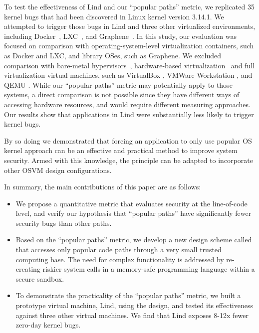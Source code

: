 To test the effectiveness of Lind and our ``popular paths'' metric, 
we replicated 35 kernel bugs that had been
discovered in Linux kernel version 3.14.1.  We attempted to trigger those
bugs in Lind and three other virtualized environments,
including Docker~\cite{Docker}, LXC~\cite{LXC}, and Graphene~\cite{Graphene-14}. 
In this study, our evaluation was focused on comparison with operating-system-level virtualization containers, such as Docker and LXC, 
and library OSes, such as Graphene. 
We excluded comparison with bare-metal hypervisors~\cite{Xen-03, VMWare-Server}, 
hardware-based virtualization~\cite{IntelVT, keller2010nohype} and full virtualization 
virtual machines, such as VirtualBox \cite{VirtualBox}, VMWare Workstation \cite{VMWare-Workstation}, and QEMU \cite{QEMU}. 
While our ``popular paths'' metric may potentially apply to those
systems, a direct comparison is not possible since they have different 
ways of accessing hardware resources, and would require different measuring approaches.
Our results show that applications in Lind were substantially less likely to trigger kernel bugs.

By so doing we demonstrated that forcing an application to only use popular
OS kernel approach can be an effective and practical method to improve
system security. Armed with this knowledge, the \lip principle can be adapted to incorporate other OSVM design configurations. 

In summary, the main contributions of this paper are as follows:

\begin{itemize}\setlength\itemsep{0em}
\item
We propose a quantitative metric that evaluates security at the line-of-code level, 
and verify our hypothesis that ``popular paths'' have significantly fewer security bugs than other paths. 
\item
Based on the ``popular paths'' metric, we develop a new design scheme called \lip that accesses only popular code paths through a very small trusted computing base. 
The need for complex functionality is addressed by re-creating riskier system calls in a memory-safe programming language within a secure sandbox.
\item
To demonstrate the practicality of the ``popular paths'' metric, we built a prototype virtual machine, Lind, using the \lip design, 
and tested its effectiveness against three other virtual machines. We find that Lind exposes 8-12x fewer zero-day kernel bugs. 
\end{itemize}
